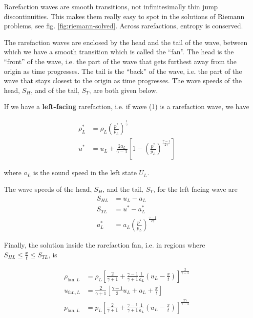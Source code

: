 Rarefaction waves are smooth transitions, not infinitesimally thin jump discontinuities.
This makes them really easy to spot in the solutions of Riemann problems, see fig. \ref{fig:riemann-solved}.
Across rarefactions, entropy is conserved.

The rarefaction waves are enclosed by the head and the tail of the wave, between which we have a smooth transition which is called the ``fan''.
The head is the ``front'' of the wave, i.e. the part of the wave that gets furthest away from the origin as time progresses.
The tail is the ``back'' of the wave, i.e. the part of the wave that stays closest to the origin as time progresses.
The wave speeds of the head, $S_H$, and of the tail, $S_T$, are both given below.


If we have a \textbf{left-facing} rarefaction, i.e. if wave (1) is a rarefaction wave, we have

\begin{align*}
	\rho^*_L &= 
		\rho_L \left( \frac{p^*}{p_L} \right) ^ \frac{1}{\gamma}\\
	u^* &= 
		u_L + \frac{2 a_L}{\gamma - 1} \left[ 1 - \left( \frac{p^*}{p_L} \right) ^ \frac{\gamma - 1}{2 \gamma}  \right]  
\end{align*}

where $a_L$ is the sound speed in the left state $U_L$.


The wave speeds of the head, $S_H$, and the tail, $S_T$, for the left facing wave are
\begin{align*}
	S_{HL} &= u_L - a_L\\
	S_{TL} &= u^* - a^*_L\\
	a^*_L  &= a_L \left( \frac{p^*}{p_L} \right) ^ \frac{\gamma - 1}{2 \gamma}
\end{align*}


Finally, the solution inside the rarefaction fan, i.e. in regions where $S_{HL} \leq \frac{x}{t} \leq S_{TL}$, is 

\begin{align*}
	\rho_{\text{fan}, L} &= 
		\rho_L \left[ \frac{2}{\gamma + 1} + \frac{\gamma - 1}{\gamma + 1} \frac{1}{a_L} \left(u_L - \frac{x}{t}\right) \right] ^ \frac{2}{\gamma -1 }\\
	u_{\text{fan}, L} &= 
		\frac{2}{\gamma + 1} \left[ \frac{\gamma - 1}{2} u_L + a_L + \frac{x}{t}  \right] \\
	p_{\text{fan}, L} &= 
		p_L \left[ \frac{2}{\gamma + 1} + \frac{\gamma - 1}{\gamma + 1} \frac{1}{a_L} \left(u_L - \frac{x}{t}\right) \right] ^ \frac{2 \gamma}{\gamma -1}
\end{align*}









